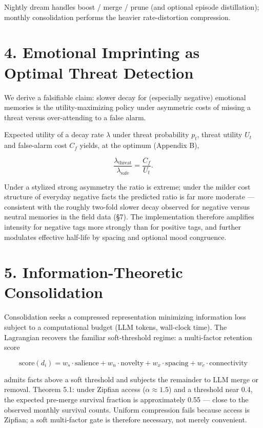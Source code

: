 \documentclass[]{article}
\begin{document}
Nightly dream handles boost / merge / prune (and optional episode
distillation); monthly consolidation performs the heavier rate-distortion
compression.

\hypertarget{emotional-imprinting-as-optimal-threat-detection}{%
\section{\texorpdfstring{\textbf{4. Emotional Imprinting as Optimal
Threat
Detection}}{4. Emotional Imprinting as Optimal Threat Detection}}\label{emotional-imprinting-as-optimal-threat-detection}}

We derive a falsifiable claim: slower decay for (especially negative)
emotional memories is the utility-maximizing policy under asymmetric costs
of missing a threat versus over-attending to a false alarm.

Expected utility of a decay rate \(\lambda\) under threat probability
\(p_t\), threat utility \(U_t\) and false-alarm cost \(C_f\) yields, at the
optimum (Appendix B),

\[
\frac{\lambda_{\text{threat}}}{\lambda_{\text{safe}}}=\frac{C_f}{U_t}.
\]

Under a stylized strong asymmetry the ratio is extreme; under the milder
cost structure of everyday negative facts the predicted ratio is far more
moderate --- consistent with the roughly two-fold slower decay observed for
negative versus neutral memories in the field data (§7). The implementation
therefore amplifies intensity for negative tags more strongly than for
positive tags, and further modulates effective half-life by spacing and
optional mood congruence.

\hypertarget{information-theoretic-consolidation}{%
\section{\texorpdfstring{\textbf{5. Information-Theoretic
Consolidation}}{5. Information-Theoretic Consolidation}}\label{information-theoretic-consolidation}}

Consolidation seeks a compressed representation minimizing information loss
subject to a computational budget (LLM tokens, wall-clock time). The
Lagrangian recovers the familiar soft-threshold regime: a multi-factor
retention score

\[
\text{score}(d_i)=w_s\cdot\text{salience}+w_n\cdot\text{novelty}
+w_x\cdot\text{spacing}+w_c\cdot\text{connectivity}
\]

admits facts above a soft threshold and subjects the remainder to LLM merge
or removal. Theorem 5.1: under Zipfian access (\(\alpha\approx1.5\)) and a
threshold near 0.4, the expected pre-merge survival fraction is
approximately 0.55 --- close to the observed monthly survival counts.
Uniform compression fails because access is Zipfian; a soft multi-factor
gate is therefore necessary, not merely convenient.
\end{document}
